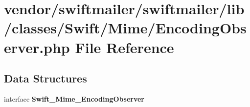 \section{vendor/swiftmailer/swiftmailer/lib/classes/\+Swift/\+Mime/\+Encoding\+Observer.php File Reference}
\label{_encoding_observer_8php}
\subsection*{Data Structures}
\begin{DoxyCompactItemize}
\item 
interface {\bf Swift\+\_\+\+Mime\+\_\+\+Encoding\+Observer}
\end{DoxyCompactItemize}
